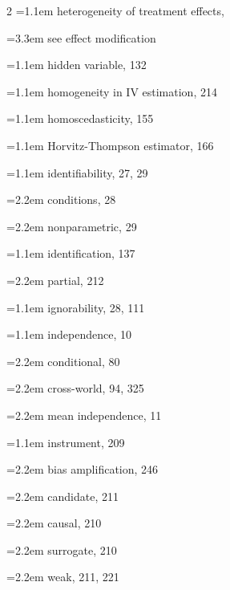 \begin{multicols}{2}
\hangindent=1.1em heterogeneity of treatment effects,\par
\hspace*{2.2em}\hangindent=3.3em see effect modification\par
\hangindent=1.1em hidden variable, 132\par
\hangindent=1.1em homogeneity in IV estimation, 214\par
\hangindent=1.1em homoscedasticity, 155\par
\hangindent=1.1em Horvitz-Thompson estimator, 166\par
\hangindent=1.1em identifiability, 27, 29\par
\hspace*{1.1em}\hangindent=2.2em conditions, 28\par
\hspace*{1.1em}\hangindent=2.2em nonparametric, 29\par
\hangindent=1.1em identification, 137\par
\hspace*{1.1em}\hangindent=2.2em partial, 212\par
\hangindent=1.1em ignorability, 28, 111\par
\hangindent=1.1em independence, 10\par
\hspace*{1.1em}\hangindent=2.2em conditional, 80\par
\hspace*{1.1em}\hangindent=2.2em cross-world, 94, 325\par
\hspace*{1.1em}\hangindent=2.2em mean independence, 11\par
\hangindent=1.1em instrument, 209\par
\hspace*{1.1em}\hangindent=2.2em bias amplification, 246\par
\hspace*{1.1em}\hangindent=2.2em candidate, 211\par
\hspace*{1.1em}\hangindent=2.2em causal, 210\par
\hspace*{1.1em}\hangindent=2.2em surrogate, 210\par
\hspace*{1.1em}\hangindent=2.2em weak, 211, 221\par

\end{multicols}
